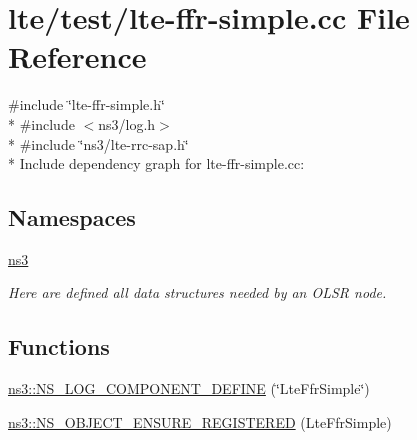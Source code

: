 \hypertarget{lte-ffr-simple_8cc}{}\section{lte/test/lte-\/ffr-\/simple.cc File Reference}
\label{lte-ffr-simple_8cc}
{\ttfamily \#include \char`\"{}lte-\/ffr-\/simple.\+h\char`\"{}}\\*
{\ttfamily \#include $<$ns3/log.\+h$>$}\\*
{\ttfamily \#include \char`\"{}ns3/lte-\/rrc-\/sap.\+h\char`\"{}}\\*
Include dependency graph for lte-\/ffr-\/simple.cc\+:
\subsection*{Namespaces}
\begin{DoxyCompactItemize}
\item 
 \hyperlink{namespacens3}{ns3}
\begin{DoxyCompactList}\small\item\em Here are defined all data structures needed by an O\+L\+SR node. \end{DoxyCompactList}\end{DoxyCompactItemize}
\subsection*{Functions}
\begin{DoxyCompactItemize}
\item 
\hyperlink{namespacens3_afb98a78d0e7b933869addda3e152ad8f}{ns3\+::\+N\+S\+\_\+\+L\+O\+G\+\_\+\+C\+O\+M\+P\+O\+N\+E\+N\+T\+\_\+\+D\+E\+F\+I\+NE} (\char`\"{}Lte\+Ffr\+Simple\char`\"{})
\item 
\hyperlink{namespacens3_a3933c1bd0806f4f197522f04b1a9e9a7}{ns3\+::\+N\+S\+\_\+\+O\+B\+J\+E\+C\+T\+\_\+\+E\+N\+S\+U\+R\+E\+\_\+\+R\+E\+G\+I\+S\+T\+E\+R\+ED} (Lte\+Ffr\+Simple)
\end{DoxyCompactItemize}
